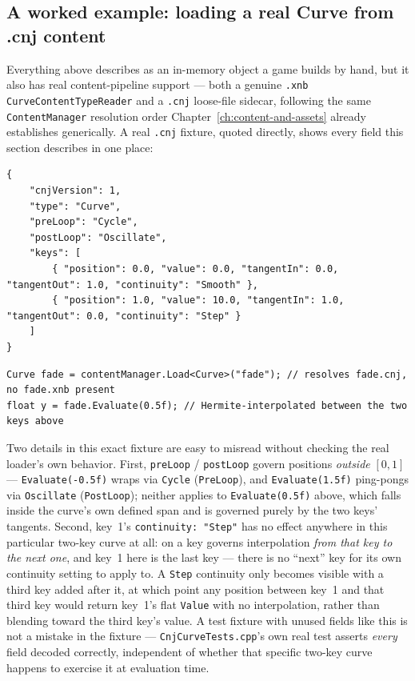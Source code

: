 \subsection{A worked example: loading a real Curve from .cnj content}

Everything above describes  as an in-memory object a game builds by hand, but
it also has real content-pipeline support --- both a genuine \texttt{.xnb}
\texttt{CurveContentTypeReader} and a \texttt{.cnj} loose-file sidecar, following the same
\texttt{ContentManager} resolution order Chapter~\ref{ch:content-and-assets} already
establishes generically. A real \texttt{.cnj} fixture, quoted directly, shows every field
this section describes in one place:

\begin{lstlisting}
{
    "cnjVersion": 1,
    "type": "Curve",
    "preLoop": "Cycle",
    "postLoop": "Oscillate",
    "keys": [
        { "position": 0.0, "value": 0.0, "tangentIn": 0.0, "tangentOut": 1.0, "continuity": "Smooth" },
        { "position": 1.0, "value": 10.0, "tangentIn": 1.0, "tangentOut": 0.0, "continuity": "Step" }
    ]
}
\end{lstlisting}

\begin{lstlisting}
Curve fade = contentManager.Load<Curve>("fade"); // resolves fade.cnj, no fade.xnb present
float y = fade.Evaluate(0.5f); // Hermite-interpolated between the two keys above
\end{lstlisting}

Two details in this exact fixture are easy to misread without checking the real loader's own
behavior. First, \texttt{preLoop} / \texttt{postLoop} govern positions \emph{outside} $[0,1]$
--- \texttt{Evaluate(-0.5f)} wraps via \texttt{Cycle} (\texttt{PreLoop}), and
\texttt{Evaluate(1.5f)} ping-pongs via \texttt{Oscillate} (\texttt{PostLoop}); neither applies
to \texttt{Evaluate(0.5f)} above, which falls inside the curve's own defined span and is
governed purely by the two keys' tangents. Second, key~1's \texttt{continuity: "Step"} has no
effect anywhere in this particular two-key curve at all:  on a key
governs interpolation \emph{from that key to the next one}, and key~1 here is the last key ---
there is no ``next'' key for its own continuity setting to apply to. A \texttt{Step}
continuity only becomes visible with a third key added after it, at which point any position
between key~1 and that third key would return key~1's flat \texttt{Value} with no
interpolation, rather than blending toward the third key's value. A test fixture with unused
fields like this is not a mistake in the fixture --- \texttt{CnjCurveTests.cpp}'s own real test
asserts \emph{every} field decoded correctly, independent of whether that specific two-key
curve happens to exercise it at evaluation time.

